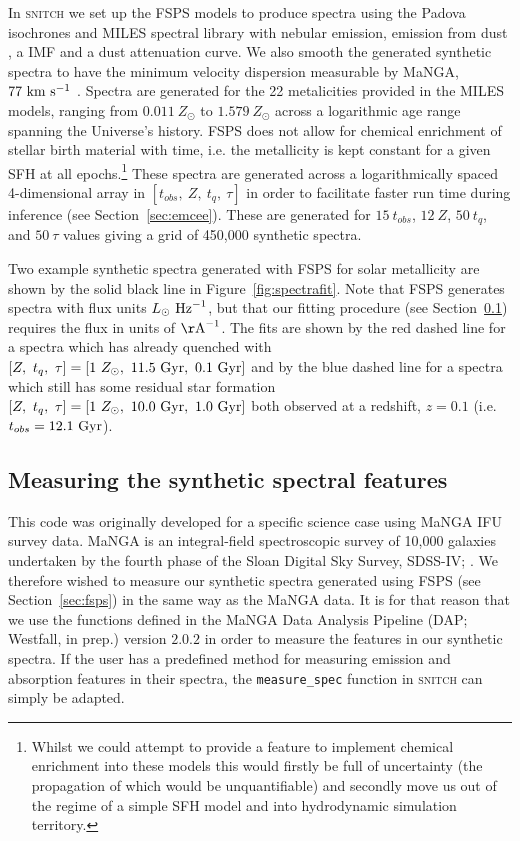 \documentclass[useAMS,usenatbib]{mn2e}
\begin{document}
In \textsc{snitch} we set up the FSPS models to produce spectra using the Padova isochrones \citep{girardi02} and MILES spectral library \citep{vazdekis16} with nebular emission, emission from dust \cite{draineli07}, a \cite{chabrier03} IMF and a \cite{calzetti00} dust attenuation curve. We also smooth the generated synthetic spectra to have the minimum velocity dispersion measurable by MaNGA, $77~\rm{km}~{s}^{-1}$ \citep{bundy15}. Spectra are generated for the 22 metalicities provided in the MILES models, ranging from $0.011~Z_{\odot}$ to $1.579~Z_{\odot}$ across a logarithmic age range spanning the Universe's history. FSPS does not allow for chemical enrichment of stellar birth material with time, i.e. the metallicity is kept constant for a given SFH at all epochs.\footnote{Whilst we could attempt to provide a feature to implement chemical enrichment into these models this would firstly be full of uncertainty (the propagation of which would be unquantifiable) and secondly move us out of the regime of a simple SFH model and into hydrodynamic simulation territory. } These spectra are generated across a logarithmically spaced 4-dimensional array in $[t_{obs},~Z,~t_q,~\tau]$ in order to facilitate faster run time during inference (see Section~\ref{sec:emcee}). These are generated for $15~t_{obs}$, $12~Z$, $50~t_q$, and $50~\tau$ values giving a grid of 450,000 synthetic spectra.

Two example synthetic spectra generated with FSPS for solar metallicity are shown by the solid black line in Figure~\ref{fig:spectrafit}. Note that FSPS generates spectra with flux units $L_{\odot}~\rm{Hz}^{-1}$, but that our fitting procedure (see Section~\ref{sec:dap}) requires the flux in units of $\rm{\AA}^{-1}$. The fits are shown by the red dashed line for a spectra which has already quenched with $[Z,~t_q,~\tau] = [1~Z_{\odot},~11.5~\rm{Gyr},~0.1~\rm{Gyr}]$ and by the blue dashed line for a spectra which still has some residual star formation $[Z,~t_q,~\tau] = [1~Z_{\odot},~10.0~\rm{Gyr},~1.0~\rm{Gyr}]$ both observed at a redshift, $z=0.1$ (i.e. $t_{obs}=12.1~\rm{Gyr}$). 

\subsection{Measuring the synthetic spectral features}\label{sec:dap}

This code was originally developed for a specific science case using MaNGA IFU survey data. MaNGA \citep[Mapping Nearby Galaxies at Apache Point Observatory; ][]{bundy15} is an integral-field spectroscopic survey of 10,000 galaxies undertaken by the fourth phase of the Sloan Digital Sky Survey, SDSS-IV; \cite{blanton17}. We therefore wished to measure our synthetic spectra generated using FSPS (see Section~\ref{sec:fsps}) in the same way as the MaNGA data. It is for that reason that we use the functions defined in the MaNGA Data Analysis Pipeline (DAP; Westfall, in prep.) version $2.0.2$ in order to measure the features in our synthetic spectra. If the user has a predefined method for measuring emission and absorption features in their spectra, the \texttt{measure\_spec} function in \textsc{snitch} can simply be adapted.
\end{document}

